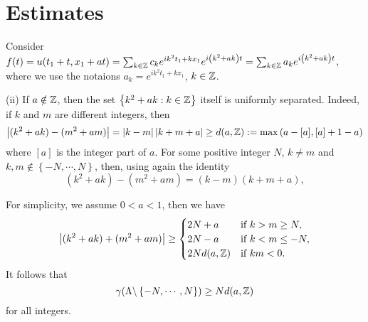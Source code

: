 \section{Estimates}
Consider $f(t)=u(t_1+t,x_1+ at)=\sum_{k\in \mathbb{Z}}^{} c_k e^{i k^2t_1+kx_1}e^{i\left( k^2+ak \right) t}=\sum_{k\in \mathbb{Z}}^{} a_k e^{i\left( k^2+ak \right) t}$, where we use the notaions $a_k=e^{ik^2t_1+kx_1}$, $k\in \mathbb{Z}$.

(ii) If $a\notin \mathbb{Z}$, then the set $\left\{k^2+ak:k\in \mathbb{Z}\right\} $ itself is uniformly separated. Indeed, if $k$ and $m$ are different integers, then
\[
  \left| (k^2+ak)-(m^2+am) \right| =\left| k-m \right| \left| k+m+a \right| \ge d(a,\mathbb{Z}):=\max\left( a-[a],[a]+1-a \right) 
\] 
where $[a]$ is the integer part of $a$. For some positive integer  $N$, $k\neq m$ and $k,m\notin  \left\{-N,\cdots ,N\right\} $, then, using again the identity
\[
  (k^2+ak)-(m^2+am)=(k-m)(k+m+a),
\] 

For simplicity, we assume $0<a<1 $, then we have
\[
  \left| (k^2+ak)+(m^2+am) \right| \ge \begin{cases}
    2N+a & \text{if }k>m\ge N,\\
    2N-a & \text{if }k<m\le -N,\\
    2Nd(a,\mathbb{Z}) & \text{if }km<0.
  \end{cases}
\] 
It follows that 
\[
  \gamma(\Lambda\backslash \left\{-N,\cdots ,N\right\} )\ge Nd(a,\mathbb{Z})
\] 
for all integers. 

